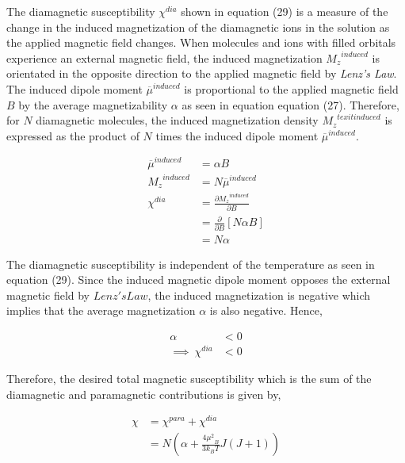 \documentclass[a4paper,11pt]{article}
\begin{document}
The diamagnetic susceptibility $\chi^{\textit{dia}}$ shown in equation (29) is a measure of the change in the induced magnetization of the diamagnetic ions in the solution as the applied magnetic field changes. When molecules and ions with filled orbitals experience an external magnetic field, the induced magnetization ${M_z}^{\textit{induced}}$ is orientated in the opposite direction to the applied magnetic field by \textit{Lenz's Law}. The induced dipole moment $\overline{\mu}^{\textit{induced}}$ is proportional to the applied magnetic field $B$  by the average magnetizability $\alpha$ as seen in equation equation (27). Therefore, for $N$ diamagnetic molecules, the induced magnetization density ${M_z}^{texit{induced}}$ is expressed as the product of $N$ times the induced dipole moment $\overline{\mu}^{\textit{induced}}$.

\begin{align}
\overline{\mu}^{\textit{induced}}	& = \alpha B\\
{M_z}^{\textit{induced}}				& = N \overline{\mu}^{\textit{induced}}\\
\chi^{\textit{dia}}					& = \frac{\partial {M_z}^{\textit{induced}}}{\partial B}\\
									& = \frac{\partial}{\partial B} \left[ N \alpha B\right]\nonumber\\
									& = N \alpha\nonumber
\end{align}

The diamagnetic susceptibility is independent of the temperature as seen in equation (29). Since the induced magnetic dipole moment opposes the external magnetic field by $Lenz's Law$, the induced magnetization is negative which implies that the average magnetization $\alpha$ is also negative. Hence,

\begin{align}
\alpha	& < 0\nonumber\\
\implies~\chi^{\textit{dia}}	& < 0
\end{align}  

Therefore, the desired total magnetic susceptibility which is the sum of the diamagnetic and paramagnetic contributions is given by,

\begin{align}
\chi	& = \chi^{\textit{para}} + \chi^{\textit{dia}}\nonumber\\
		& = N \left( \alpha + \frac{4 {\mu^2}_B}{3 k_B T} J(J+1) \right)
\end{align} 
\end{document}

